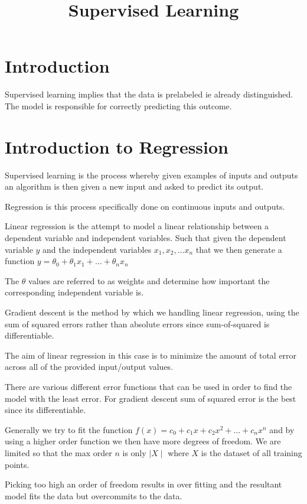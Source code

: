 \documentclass{article}
\title{Supervised Learning}
\author{}
\date{}
\begin{document}
\nocite{*}
\maketitle
\section{Introduction}

Supervised learning implies that the data is prelabeled ie already
distinguished. The model is responsible for correctly predicting this outcome.

\section{Introduction to Regression}

Supervised learning is the process whereby given examples of inputs and outputs
an algorithm is then given a new input and asked to predict its output.

Regression is this process specifically done on continuous inputs and outputs.

Linear regression is the attempt to model a linear relationship between a
dependent variable and independent variables. Such that given the dependent
variable $y$ and the independent variables $x_1, x_2, \ldots x_n$ that we then
generate a function $y = \theta_0 + \theta_1x_1 + \ldots + \theta_nx_n$

The $\theta$ values are referred to as weights and determine how important the
corresponding independent variable is.

Gradient descent is the method by which we handling linear regression, using the
sum of squared errors rather than absolute errors since sum-of-squared is
differentiable.

The aim of linear regression in this case is to minimize the amount of total
error across all of the provided input/output values.

There are various different error functions that can be used in order to find
the model with the least error. For gradient descent sum of squared error is the
best since its differentiable.

Generally we try to fit the function
$f(x) = c_0 + c_1x + c_2x^2 + \ldots + c_nx^n$ and by using a higher order
function we then have more degrees of freedom. We are limited so that the max
order $n$ is only $\mid X \mid$ where $X$ is the dataset of all training points.

Picking too high an order of freedom results in over fitting and the resultant
model fits the data but overcommits to the data.
\end{document}
